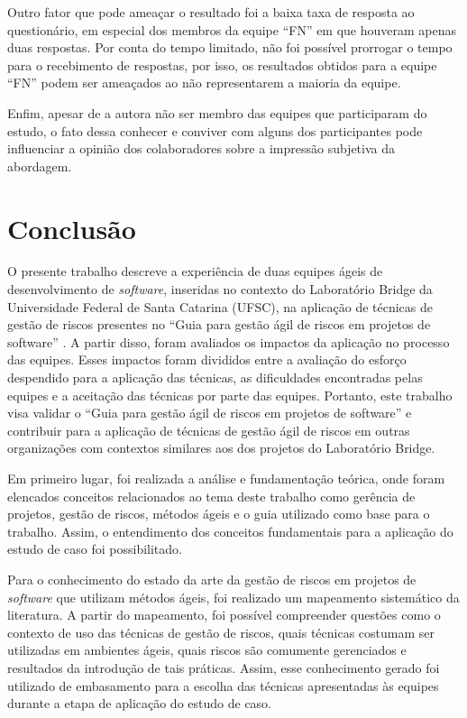 \documentclass[
    12pt,       %
    openright,      %
    twoside,      %
    a4paper,      %
    english,      %
    french,       %
    spanish,      %
    brazil,       %
    ]{abntex2}
\begin{document}
Outro fator que pode ameaçar o resultado foi a baixa taxa de resposta ao questionário, em especial dos membros da equipe ``FN'' em que houveram apenas duas respostas. Por conta do tempo limitado, não foi possível prorrogar o tempo para o recebimento de respostas, por isso, os resultados obtidos para a equipe ``FN'' podem ser ameaçados ao não representarem a maioria da equipe.

Enfim, apesar de a autora não ser membro das equipes que participaram do estudo, o fato dessa conhecer e conviver com alguns dos participantes pode influenciar a opinião dos colaboradores sobre a impressão subjetiva da abordagem. 

\chapter{Conclusão}

O presente trabalho descreve a experiência de duas equipes ágeis de desenvolvimento de \textit{software}, inseridas no contexto do Laboratório Bridge da Universidade Federal de Santa Catarina (UFSC), na aplicação de técnicas de gestão de riscos presentes no “Guia para gestão ágil de riscos
em projetos de software” \cite{Vieira:2020}. A partir disso, foram avaliados os impactos da aplicação no processo das equipes. Esses impactos foram divididos entre a avaliação do esforço despendido para a aplicação das técnicas, as dificuldades encontradas pelas equipes e a aceitação das técnicas por parte das equipes. Portanto, este trabalho visa validar o “Guia para gestão ágil de riscos em projetos de software” e contribuir para a aplicação de técnicas de gestão ágil de riscos em outras organizações com contextos similares aos dos projetos do Laboratório Bridge.

Em primeiro lugar, foi realizada a análise e fundamentação teórica, onde foram elencados conceitos relacionados ao tema deste trabalho como gerência de projetos, gestão de riscos, métodos ágeis e o guia utilizado como base para o trabalho. Assim, o entendimento dos conceitos fundamentais para a aplicação do estudo de caso foi possibilitado.

Para o conhecimento do estado da arte da gestão de riscos em projetos de \textit{software} que utilizam métodos ágeis, foi realizado um mapeamento sistemático da literatura. A partir do mapeamento, foi possível compreender questões como o contexto de uso das técnicas de gestão de riscos, quais técnicas costumam ser utilizadas em ambientes ágeis, quais riscos são comumente gerenciados e resultados da introdução de tais práticas. Assim, esse conhecimento gerado foi utilizado de embasamento para a escolha das técnicas apresentadas às equipes durante a etapa de aplicação do estudo de caso.
\end{document}
